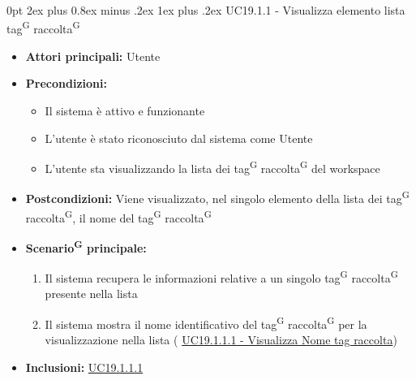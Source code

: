 \documentclass[a4paper, 11pt]{article}
\makeatletter
\renewcommand\subparagraph{\@startsection{subparagraph}{5}
  {0pt}
  {2ex plus 0.8ex minus .2ex}
  {1ex plus .2ex}
  {\normalfont\normalsize\bfseries\color{AccentColor}}}
\makeatother
\begin{document}
\subparagraph{UC19.1.1 - Visualizza elemento lista tag\textsuperscript{G} raccolta\textsuperscript{G}} \label{UC19.1.1}
\begin{itemize}
	\item \textbf{Attori principali:} Utente
	\item \textbf{Precondizioni:} 
	\begin{itemize}
		\item Il sistema è attivo e funzionante
		\item L'utente è stato riconosciuto dal sistema come Utente
		\item L'utente sta visualizzando la lista dei tag\textsuperscript{G} raccolta\textsuperscript{G} del workspace
	\end{itemize}
	\item \textbf{Postcondizioni:} Viene visualizzato, nel singolo elemento della lista dei tag\textsuperscript{G} raccolta\textsuperscript{G}, il nome del tag\textsuperscript{G} raccolta\textsuperscript{G}
	\item \textbf{Scenario\textsuperscript{G} principale:}
	\begin{enumerate}
		\item Il sistema recupera le informazioni relative a un singolo tag\textsuperscript{G} raccolta\textsuperscript{G} presente nella lista
		\item Il sistema mostra il nome identificativo del tag\textsuperscript{G} raccolta\textsuperscript{G} per la visualizzazione nella lista  ( \hyperref[UC19.1.1.1]{UC19.1.1.1 - Visualizza Nome tag raccolta})
	\end{enumerate}
	\item \textbf{Inclusioni:} \hyperref[UC19.1.1.1]{UC19.1.1.1}
\end{itemize}
\end{document}
